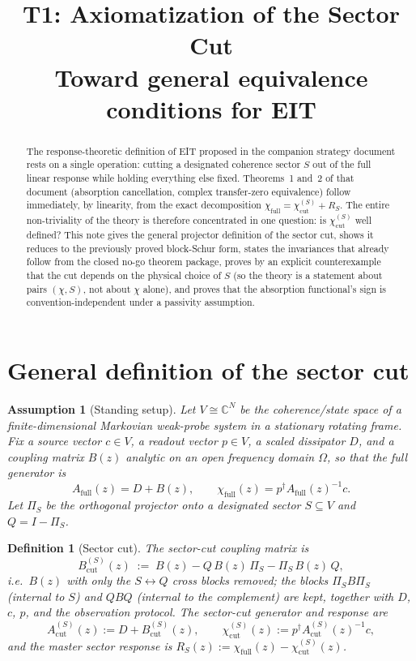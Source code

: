 \documentclass[11pt,a4paper]{article}
\title{T1: Axiomatization of the Sector Cut\\
\large Toward general equivalence conditions for EIT}
\author{}
\date{}
\newtheorem{definition}[theorem]{Definition}
\newtheorem{assumption}[theorem]{Assumption}
\theoremstyle{remark}
\begin{document}
\maketitle

\begin{abstract}
The response-theoretic definition of EIT proposed in the companion
strategy document rests on a single operation: cutting a designated
coherence sector $S$ out of the full linear response while holding
everything else fixed. Theorems~1 and~2 of that document (absorption
cancellation, complex transfer-zero equivalence) follow immediately,
by linearity, from the exact decomposition $\chi_{\mathrm{full}} =
\chi^{(S)}_{\mathrm{cut}} + R_S$. The entire non-triviality of the
theory is therefore concentrated in one question: is
$\chi^{(S)}_{\mathrm{cut}}$ well defined? This note gives the general
projector definition of the sector cut, shows it reduces to the
previously proved block-Schur form, states the invariances that
already follow from the closed no-go theorem package, proves by an
explicit counterexample that the cut depends on the physical choice of
$S$ (so the theory is a statement about pairs $(\chi,S)$, not about
$\chi$ alone), and proves that the absorption functional's sign is
convention-independent under a passivity assumption.
\end{abstract}

\section{General definition of the sector cut}

\begin{assumption}[Standing setup]
Let $V\cong\mathbb C^N$ be the coherence/state space of a finite-dimensional
Markovian weak-probe system in a stationary rotating frame. Fix a source
vector $c\in V$, a readout vector $p\in V$, a scaled dissipator $D$, and a
coupling matrix $B(z)$ analytic on an open frequency domain $\Omega$, so
that the full generator is
\[
A_{\mathrm{full}}(z)=D+B(z),\qquad
\chi_{\mathrm{full}}(z)=p^\dagger A_{\mathrm{full}}(z)^{-1}c .
\]
Let $\Pi_S$ be the orthogonal projector onto a designated sector
$S\subseteq V$ and $Q=I-\Pi_S$.
\end{assumption}

\begin{definition}[Sector cut]\label{def:cut}
The sector-cut coupling matrix is
\[
B^{(S)}_{\mathrm{cut}}(z) \;:=\; B(z)-Q\,B(z)\,\Pi_S-\Pi_S\,B(z)\,Q ,
\]
i.e.\ $B(z)$ with only the $S\leftrightarrow Q$ cross blocks removed; the
blocks $\Pi_S B\Pi_S$ (internal to $S$) and $QBQ$ (internal to the
complement) are kept, together with $D$, $c$, $p$, and the observation
protocol. The sector-cut generator and response are
\[
A^{(S)}_{\mathrm{cut}}(z):=D+B^{(S)}_{\mathrm{cut}}(z),\qquad
\chi^{(S)}_{\mathrm{cut}}(z):=p^\dagger A^{(S)}_{\mathrm{cut}}(z)^{-1}c,
\]
and the master sector response is
$R_S(z):=\chi_{\mathrm{full}}(z)-\chi^{(S)}_{\mathrm{cut}}(z)$.
\end{definition}
\end{document}
